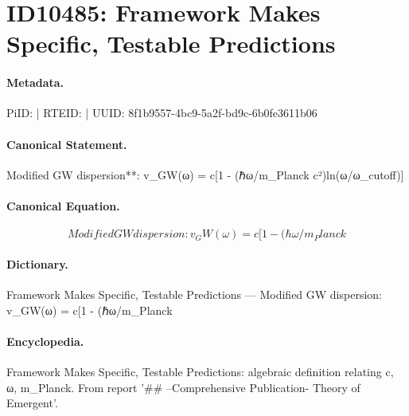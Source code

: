 \section*{ID10485: Framework Makes Specific, Testable Predictions}
\paragraph{Metadata.}
PiID:  | RTEID:  | UUID: 8f1b9557-4bc9-5a2f-bd9c-6b0fe3611b06

\paragraph{Canonical Statement.}
Modified GW dispersion**: v\_GW(ω) = c[1 - (ℏω/m\_Planck c²)ln(ω/ω\_cutoff)]

\paragraph{Canonical Equation.}
\[
Modified GW dispersion: v_GW(ω) = c[1 - (ℏω/m_Planck
\]

\paragraph{Dictionary.}
Framework Makes Specific, Testable Predictions — Modified GW dispersion: v\_GW(ω) = c[1 - (ℏω/m\_Planck

\paragraph{Encyclopedia.}
Framework Makes Specific, Testable Predictions: algebraic definition relating c, ω, m\_Planck. From report '\#\# --Comprehensive Publication- Theory of Emergent'.
